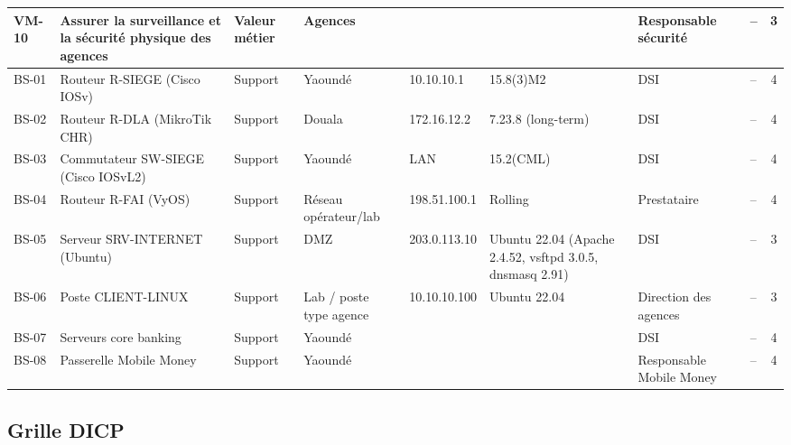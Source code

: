 \documentclass[11pt,a4paper]{article}
\newcommand{\NA}{\textemdash}
\begin{document}
\begin{longtable}{p{0.8cm} p{2.5cm} p{1.3cm} p{1.2cm} p{1.7cm} p{1.5cm} p{2.1cm} p{1.2cm} c}
		\hline
		VM-10 & Assurer la surveillance et la sécurité physique des agences & Valeur métier & Agences & \NA & \NA & Responsable sécurité & -- & 3\\
		\hline
		BS-01 & Routeur R-SIEGE (Cisco IOSv) & Support & Yaoundé & 10.10.10.1 & 15.8(3)M2 & DSI & -- & 4\\
		\hline
		BS-02 & Routeur R-DLA (MikroTik CHR) & Support & Douala & 172.16.12.2 & 7.23.8 (long-term) & DSI & -- & 4\\
		\hline
		BS-03 & Commutateur SW-SIEGE (Cisco IOSvL2) & Support & Yaoundé & LAN & 15.2(CML) & DSI & -- & 4\\
		\hline
		BS-04 & Routeur R-FAI (VyOS) & Support & Réseau opérateur/lab & 198.51.100.1 & Rolling & Prestataire & -- & 4\\
		\hline
		BS-05 & Serveur SRV-INTERNET (Ubuntu) & Support & DMZ & 203.0.113.10 & Ubuntu 22.04 (Apache 2.4.52, vsftpd 3.0.5, dnsmasq 2.91) & DSI & -- & 3\\
		\hline
		BS-06 & Poste CLIENT-LINUX & Support & Lab / poste type agence & 10.10.10.100 & Ubuntu 22.04 & Direction des agences & -- & 3\\
		\hline
		BS-07 & Serveurs core banking & Support & Yaoundé & \NA & \NA & DSI & -- & 4\\
		\hline
		BS-08 & Passerelle Mobile Money & Support & Yaoundé & \NA & \NA & Responsable Mobile Money & -- & 4\\
		\hline
	\end{longtable}
	\normalsize
	
	\subsection{Grille DICP}
	
\end{document}
